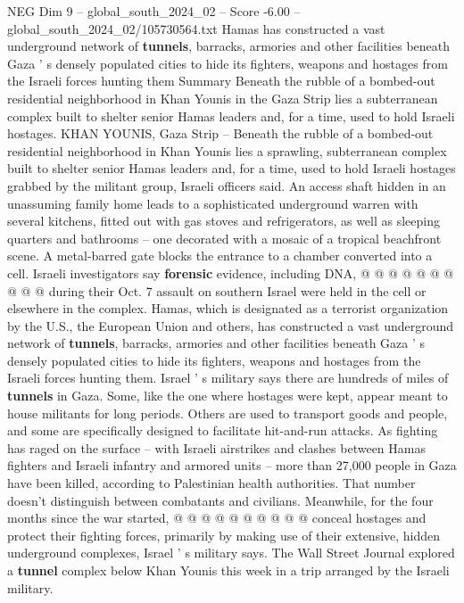 \begin{textsample}{NEG Dim 9 – global\_south\_2024\_02 – Score -6.00 – global\_south\_2024\_02/105730564.txt}  \label{ex:f9_neg_342}
Hamas has constructed a vast underground network of \textbf{tunnels}, barracks, armories and other facilities beneath Gaza ' s densely populated cities to hide its fighters, weapons and hostages from the Israeli forces hunting them Summary Beneath the rubble of a bombed-out residential neighborhood in Khan Younis in the Gaza Strip lies a subterranean complex built to shelter senior Hamas leaders and, for a time, used to hold Israeli hostages.
KHAN YOUNIS, Gaza Strip -- Beneath the rubble of a bombed-out residential neighborhood in Khan Younis lies a sprawling, subterranean complex built to shelter senior Hamas leaders and, for a time, used to hold Israeli hostages grabbed by the militant group, Israeli officers said.
An access shaft hidden in an unassuming family home leads to a sophisticated underground warren with several kitchens, fitted out with gas stoves and refrigerators, as well as sleeping quarters and bathrooms -- one decorated with a mosaic of a tropical beachfront scene.
A metal-barred gate blocks the entrance to a chamber converted into a cell.
Israeli investigators say \textbf{forensic} evidence, including DNA, @ @ @ @ @ @ @ @ @ @ during their Oct. 7 assault on southern Israel were held in the cell or elsewhere in the complex.
Hamas, which is designated as a terrorist organization by the U.S., the European Union and others, has constructed a vast underground network of \textbf{tunnels}, barracks, armories and other facilities beneath Gaza ' s densely populated cities to hide its fighters, weapons and hostages from the Israeli forces hunting them.
Israel ' s military says there are hundreds of miles of \textbf{tunnels} in Gaza.
Some, like the one where hostages were kept, appear meant to house militants for long periods.
Others are used to transport goods and people, and some are specifically designed to facilitate hit-and-run attacks.
As fighting has raged on the surface -- with Israeli airstrikes and clashes between Hamas fighters and Israeli infantry and armored units -- more than 27,000 people in Gaza have been killed, according to Palestinian health authorities.
That number doesn't distinguish between combatants and civilians.
Meanwhile, for the four months since the war started, @ @ @ @ @ @ @ @ @ @ conceal hostages and protect their fighting forces, primarily by making use of their extensive, hidden underground complexes, Israel ' s military says.
The Wall Street Journal explored a \textbf{tunnel} complex below Khan Younis this week in a trip arranged by the Israeli military.

\end{textsample}
